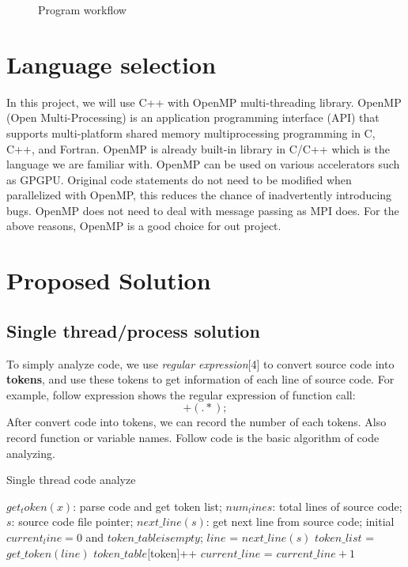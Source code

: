 \documentclass{acm_proc_article-sp}
\begin{document}
\begin{figure}
	\centering
	\caption{Program workflow}
\end{figure}

\section{Language selection}
	In this project, we will use C++ with OpenMP multi-threading library.
	OpenMP (Open Multi-Processing) is an application programming interface 
	(API) that supports multi-platform shared memory multiprocessing 
	programming in C, C++, and Fortran. OpenMP is already built-in library in 
	C/C++ which is the language we are familiar with. OpenMP can be used on 
	various accelerators such as GPGPU. Original code statements do not 
	need to be modified when parallelized with OpenMP, this reduces the chance 
	of inadvertently introducing bugs. OpenMP does not need to deal with message 
	passing as MPI does. For the above reasons, OpenMP is a good choice for 
	out project.
	
\section{Proposed Solution}
\subsection{Single thread/process solution}
	To simply analyze code, we use \textit{regular expression}[4] to convert source
	code into \textbf{tokens}, and use these tokens to get information of each line
	of source code. For example, follow expression shows the regular expression of function call: 
	\begin{displaymath}
		[a-zA-Z_][a-zA-Z0-9_]+(.*);
	\end{displaymath}
	After convert code into tokens, we can record the number of each tokens. Also
	record function or variable names.
	Follow code is the basic algorithm of code analyzing.
	\begin{algorithm}[h]
		\caption{Single thread code analyze}
		\begin{algorithmic}[1]
			\Require
				$get_token(x)$: parse code and get token list;
				$num_lines$: total lines of source code;
				$s$: source code file pointer;
				$next\_line(s)$: get next line from source code;
			\State initial $current_line=0$ and $token\_table is empty$;
			\Repeat
				\State $line$ = $next\_line(s)$
				\State $token\_list$ = $get\_token(line)$
					\State $token\_table[$token]++
				\EndFor
				\State $current\_line$ = $current\_line + 1$
		\end{algorithmic}
	\end{algorithm}
\end{document}
